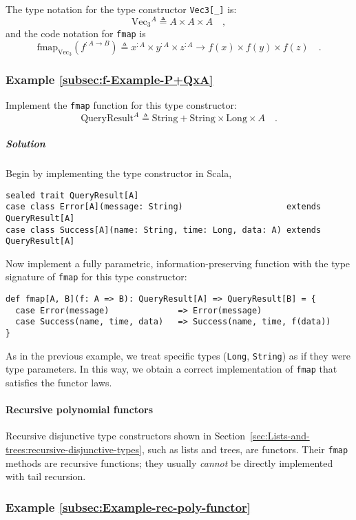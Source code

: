 The type notation for the type constructor \lstinline!Vec3[_]! is:
\[
\text{Vec}_{3}{}^{A}\triangleq A\times A\times A\quad,
\]
and the code notation for \lstinline!fmap! is
\[
\text{fmap}_{\text{Vec}_{3}}(f^{:A\rightarrow B})\triangleq x^{:A}\times y^{:A}\times z^{:A}\rightarrow f(x)\times f(y)\times f(z)\quad.
\]


\subsubsection{Example \label{subsec:f-Example-P+QxA}\ref{subsec:f-Example-P+QxA}}

Implement the \lstinline!fmap! function for this type constructor:
\[
\text{QueryResult}^{A}\triangleq\text{String}+\text{String}\times\text{Long}\times A\quad.
\]


\subparagraph{Solution}

Begin by implementing the type constructor in Scala,
\begin{lstlisting}
sealed trait QueryResult[A]
case class Error[A](message: String)                     extends QueryResult[A]
case class Success[A](name: String, time: Long, data: A) extends QueryResult[A]
\end{lstlisting}
Now implement a fully parametric, information-preserving function
with the type signature of \lstinline!fmap! for this type constructor:
\begin{lstlisting}
def fmap[A, B](f: A => B): QueryResult[A] => QueryResult[B] = {
  case Error(message)              => Error(message)
  case Success(name, time, data)   => Success(name, time, f(data))
}
\end{lstlisting}
As in the previous example, we treat specific types (\lstinline!Long!,
\lstinline!String!) as if they were type parameters. In this way,
we obtain a correct implementation of \lstinline!fmap! that satisfies
the functor laws.

\paragraph{Recursive polynomial functors}

Recursive disjunctive type constructors shown in Section~\ref{sec:Lists-and-trees:recursive-disjunctive-types},
such as lists and trees, are functors. Their \lstinline!fmap! methods
are recursive functions; they usually \emph{cannot} be directly implemented
with tail recursion. 

\subsubsection{Example \label{subsec:Example-rec-poly-functor}\ref{subsec:Example-rec-poly-functor}}


